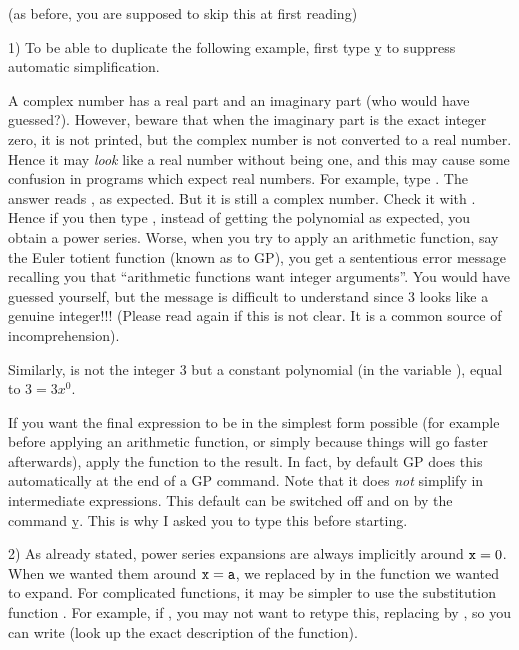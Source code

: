  (as before, you are supposed to skip this
at first reading)

1) To be able to duplicate the following example, first type \b{y} to
suppress automatic simplification.

A complex number has a real part and an imaginary part (who would have
guessed?). However, beware that when the imaginary part is the exact integer
zero, it is not printed, but the complex number is not converted to a real
number. Hence it may {\it look\/} like a real number without being one, and
this may cause some confusion in programs which expect real numbers. For
example, type . The answer reads , as expected. But
it is still a complex number. Check it with . Hence if you then
type , instead of getting the polynomial
 as expected, you obtain a power series.
Worse, when you try to apply an arithmetic function, say the Euler totient
function (known as  to GP), you get a sententious error message
recalling you that ``arithmetic functions want integer arguments''. You would
have guessed yourself, but the message is difficult to understand since 3 looks
like a genuine integer!!! (Please read again if this is not clear. It is a
common source of incomprehension).

Similarly,  is not the integer 3 but a constant polynomial
(in the variable ), equal to $3 = 3x^0$.

If you want the final expression to be in the simplest form possible (for
example before applying an arithmetic function, or simply because things will
go faster afterwards), apply the function  to the result. In
fact, by default GP does this automatically at the end of a GP command. Note
that it does {\it not\/} simplify in intermediate expressions. This default
can be switched off and on by the command \b{y}. This is why I asked you to
type this before starting.

2) As already stated, power series expansions are always implicitly around
${\tt x}=0$. When we wanted them around ${\tt x}={\tt a}$, we replaced
 by  in the function we wanted to expand. For complicated
functions, it may be simpler to use the substitution function .
For example, if ,
you may not want to retype this, replacing  by , so you can
write  (look up the exact description of the
 function).

